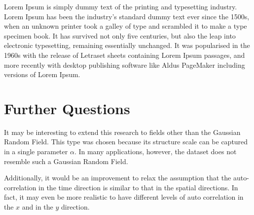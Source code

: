 \documentclass{acm_proc_article-sp}
\begin{document}
Lorem Ipsum is simply dummy text of the printing and typesetting industry. Lorem Ipsum has been the industry's standard dummy text ever since the 1500s, when an unknown printer took a galley of type and scrambled it to make a type specimen book. It has survived not only five centuries, but also the leap into electronic typesetting, remaining essentially unchanged. It was popularised in the 1960s with the release of Letraset sheets containing Lorem Ipsum passages, and more recently with desktop publishing software like Aldus PageMaker including versions of Lorem Ipsum.

\section{Further Questions}
\label{Further Questions}

It may be interesting to extend this research to fields other than the Gaussian Random Field. This type was chosen because its structure scale can be captured in a single parameter $\alpha$. In many applications, however, the dataset does not resemble such a Gaussian Random Field.

Additionally, it would be an improvement to relax the assumption that the auto-correlation in the time direction is similar to that in the spatial directions. In fact, it may even be more realistic to have different levels of auto correlation in the $x$ and in the $y$ direction.

{
\footnotesize


}
\end{document}
